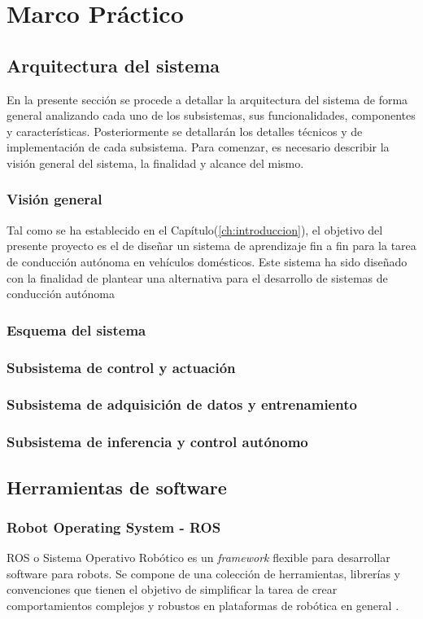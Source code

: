 \chapter{Marco Práctico} \label{ch:m_practico}
\section{Arquitectura del sistema}
En la presente sección se procede a detallar la arquitectura del sistema de forma general analizando cada uno de 
los subsistemas, sus funcionalidades, componentes y características. Posteriormente se detallarán los detalles técnicos
y de implementación de cada subsistema. Para comenzar, es necesario describir la visión general del sistema, la finalidad 
y alcance del mismo.

    \subsection{Visión general}
    Tal como se ha establecido en el Capítulo(\ref{ch:introduccion}), el objetivo del presente proyecto es el de diseñar 
    un sistema de aprendizaje fin a fin para la tarea de conducción autónoma en vehículos domésticos. Este sistema ha sido 
    diseñado con la finalidad de plantear una alternativa para el desarrollo de sistemas de conducción autónoma 

    \subsection{Esquema del sistema}

    \subsection{Subsistema de control y actuación} \label{sec:esqcontrol}
    \subsection{Subsistema de adquisición de datos y entrenamiento}
    \subsection{Subsistema de inferencia y control autónomo}
    

\section{Herramientas de software}
    \subsection{Robot Operating System - ROS}
    ROS o Sistema Operativo Robótico es un \textit{framework} flexible para desarrollar software para robots. Se compone 
    de una colección de herramientas, librerías y convenciones que tienen el objetivo de simplificar la tarea de crear 
    comportamientos complejos y robustos en plataformas de robótica en general \cite{ros}.

